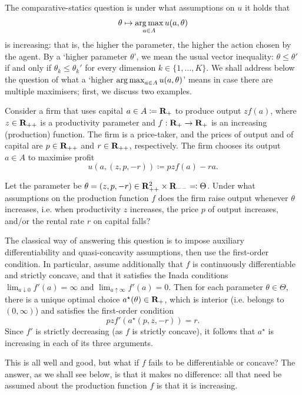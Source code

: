 The comparative-statics question is under what assumptions on $u$ it holds that
%
\begin{equation*}
	\theta \mapsto \operatorname*{arg\,max}_{a \in A} u(a,\theta)
\end{equation*}
%
is increasing: that is, the higher the parameter, the higher the action chosen by the agent. By a `higher parameter $\theta$', we mean the usual vector inequality: $\theta \leq \theta'$ if and only if $\theta_k \leq \theta_k'$ for every dimension $k \in \{1,\dots,K\}$. We shall address below the question of what a `higher $\operatorname*{arg\,max}_{a \in A} u(a,\theta)$' means in case there are multiple maximisers; first, we discuss two examples.

\begin{example}
	\label{example:prod}
	Consider a firm that uses capital $a \in A \coloneqq \mathbf{R}_+$ to produce output $z f(a)$, where $z \in \mathbf{R}_{++}$ is a productivity parameter and $f : \mathbf{R}_+ \to \mathbf{R}_+$ is an increasing (production) function. The firm is a price-taker, and the prices of output and of capital are $p \in \mathbf{R}_{++}$ and $r \in \mathbf{R}_{++}$, respectively. The firm chooses its output $a \in A$ to maximise profit
	\begin{equation*}
		u(a,(z,p,-r)) \coloneqq pzf(a) - ra .
	\end{equation*}
	
	Let the parameter be $\theta = (z,p,-r) \in \mathbf{R}_{++}^2 \times \mathbf{R}_{--} \eqqcolon \Theta$. Under what assumptions on the production function $f$ does the firm raise output whenever $\theta$ increases, i.e. when productivity $z$ increases, the price $p$ of output increases, and/or the rental rate $r$ on capital falls?
	
	The classical way of answering this question is to impose auxiliary differentiability and quasi-concavity assumptions, then use the first-order condition. In particular, assume additionally that $f$ is continuously differentiable and strictly concave, and that it satisfies the Inada conditions $\lim_{a \downarrow 0} f'(a) = \infty$ and $\lim_{a \uparrow \infty} f'(a) = 0$. Then for each parameter $\theta \in \Theta$, there is a unique optimal choice $a^\star(\theta) \in \mathbf{R}_+$, which is interior (i.e. belongs to $(0,\infty)$) and satisfies the first-order condition
	\begin{equation*}
		pzf'\left(a^\star(p,z,-r)\right) = r .
	\end{equation*}
	Since $f'$ is strictly decreasing (as $f$ is strictly concave), it follows that $a^\star$ is increasing in each of its three arguments.

	This is all well and good, but what if $f$ fails to be differentiable or concave? The answer, as we shall see below, is that it makes no difference: all that need be assumed about the production function $f$ is that it is increasing.
\end{example}

